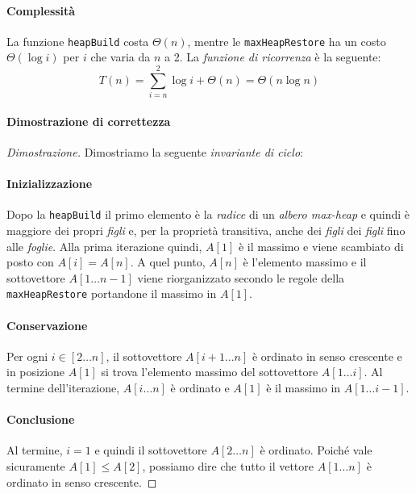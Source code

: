 \paragraph{Complessità}
La funzione \texttt{heapBuild} costa $\Theta(n)$, mentre le \texttt{maxHeapRestore}
ha un costo $\Theta(\log i)$ per $i$ che varia da $n$ a 2. La \emph{funzione di
ricorrenza} è la seguente:
\[T(n)=\sum_{i=n}^2\log i+\Theta(n)=\Theta(n\log n)\]

\paragraph{Dimostrazione di correttezza}
\begin{proof}[Dimostrazione]
    Dimostriamo la seguente \emph{invariante di ciclo}:
    
    \smallskip{}
    \paragraph{Inizializzazione}
    Dopo la \texttt{heapBuild} il primo elemento è la \emph{radice} di un
    \emph{albero max-heap} e quindi è maggiore dei propri \emph{figli} e, per la
    proprietà transitiva, anche dei \emph{figli} dei \emph{figli} fino alle
    \emph{foglie}. Alla prima iterazione quindi, $A[1]$ è il massimo e viene
    scambiato di posto con $A[i]=A[n]$. A quel punto, $A[n]$ è l'elemento
    massimo e il sottovettore $A[1\dots n-1]$ viene riorganizzato secondo le
    regole della \texttt{maxHeapRestore} portandone il massimo in $A[1]$.
    \paragraph{Conservazione}
    Per ogni $i\in[2\dots n]$, il sottovettore $A[i+1\dots n]$ è ordinato
    in senso crescente e in posizione $A[1]$ si trova l'elemento massimo del
    sottovettore $A[1\dots i]$. Al termine dell'iterazione, $A[i\dots n]$ è
    ordinato e $A[1]$ è il massimo in $A[1\dots i-1]$.
    \paragraph{Conclusione}
    Al termine, $i=1$ e quindi il sottovettore $A[2\dots n]$ è ordinato. Poiché
    vale sicuramente $A[1]\leq A[2]$, possiamo dire che tutto il vettore $A[1\dots
    n]$ è ordinato in senso crescente.
\end{proof}

